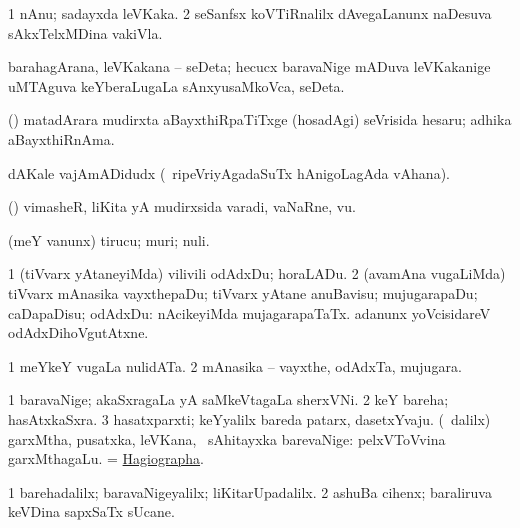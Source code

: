 \begin{center}
\noindent 
\gl{\pagu}
\expl{}
\bmng
\bnum
\num{1}  nAnu; sadayxda leVKaka. 
\num{2}  seSanfsx koVTiRnalilx dAvegaLanunx naDesuva sAkxTelxMDina vakiVla. 
\enum
\emng
\eentry

\bentry 
{} 
\gl{\nA}
\expl{}
\bmng
barahagArana, leVKakana -- seDeta; hecucx baravaNige mADuva leVKakanige uMTAguva keYberaLugaLa sAnxyusaMkoVca, seDeta. 
\emng
\eentry

\bentry
{} 
\gl{\nA}
\expl{}
\bmng
(\ame) matadArara mudirxta aBayxthiRpaTiTxge (hosadAgi) seVrisida hesaru; adhika aBayxthiRnAma. 
\emng
\eentry

\bentry
{} 
\gl{\nA}
\expl{}
\bmng
dAKale vajAmADidudx (\kanmu\ ripeVriyAgadaSuTx hAnigoLagAda vAhana). 
\emng
\eentry

\bentry
{} 
\gl{\nA}
\expl{}
\bmng
(\AmA) vimasheR, liKita yA mudirxsida varadi, vaNaRne, \mo vu. 
\emng
\eentry

\bentry
{} 
\gl{\sakirx}
\expl{}
\bmng
(meY \mo vanunx) tirucu; muri; nuli. 
\emng

\noindent
\gl{\akirx}
\expl{}
\bmng
\bnum
\num{1} (tiVvarx yAtaneyiMda) vilivili odAdxDu; horaLADu. 
\num{2} (avamAna \mo vugaLiMda) tiVvarx mAnasika vayxthepaDu; tiVvarx yAtane anuBavisu; mujugarapaDu; caDapaDisu; odAdxDu:  nAcikeyiMda mujagarapaTaTx.  adanunx yoVcisidareV odAdxDihoVgutAtxne. 
\enum
\emng
\eentry

\bentry
{} 
\gl{\nA}
\expl{}
\bmng
\bnum
\num{1} meYkeY \mo vugaLa nulidATa. 
\num{2} mAnasika -- vayxthe, odAdxTa, mujugara. 
\enum
\emng
\eentry

\bentry
{} 
\gl{\nA}
\expl{}
\bmng
\bnum
\num{1} baravaNige; akaSxragaLa yA saMkeVtagaLa sherxVNi. 
\num{2} keY bareha; hasAtxkaSxra. 
\num{3} hasatxparxti; keYyalilx bareda patarx, dasetxYvaju. 
 (\sA\ \bava dalilx) 
\banum
{} garxMtha, pusatxka, leVKana, \mo\ sAhitayxka barevaNige:  pelxVToVvina garxMthagaLu. 
  = \hyperref{kandict_h.pdf}{H}{hagiographa}{Hagiographa}. 
\eanum
\numie
\enum
\emng

\noindent
\gl{\pagu}
\expl{}
\bmng
\bnum
\num{1}  barehadalilx; baravaNigeyalilx; liKitarUpadalilx. 
\hypertarget{writing pagu(2)}{} 
\num{2}  ashuBa cihenx; baraliruva keVDina sapxSaTx sUcane. 
\enum
\emng
\eentry


\end{center}
